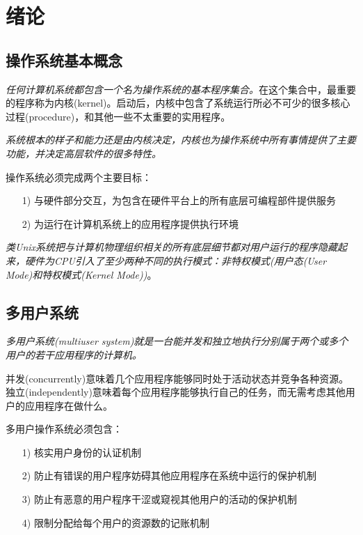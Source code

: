 \chapter{绪论}

\section{操作系统基本概念}

    \emph{任何计算机系统都包含一个名为操作系统的基本程序集合。}在这个集合中，最重要的程序称为内核(kernel)。启动后，内核中包含了系统运行所必不可少的很多核心过程(procedure)，和其他一些不太重要的实用程序。

    \emph{系统根本的样子和能力还是由内核决定，内核也为操作系统中所有事情提供了主要功能，并决定高层软件的很多特性。}

    操作系统必须完成两个主要目标：

\begin{itemize}
    \item [1)] 与硬件部分交互，为包含在硬件平台上的所有底层可编程部件提供服务
    \item [2)] 为运行在计算机系统上的应用程序提供执行环境
\end{itemize}

    \emph{类Unix系统把与计算机物理组织相关的所有底层细节都对用户运行的程序隐藏起来，硬件为CPU引入了至少两种不同的执行模式：非特权模式(用户态(User Mode)和特权模式(Kernel Mode))}。

\section{多用户系统}

    \emph{多用户系统(multiuser system)就是一台能并发和独立地执行分别属于两个或多个用户的若干应用程序的计算机。}

    并发(concurrently)意味着几个应用程序能够同时处于活动状态并竞争各种资源。独立(independently)意味着每个应用程序能够执行自己的任务，而无需考虑其他用户的应用程序在做什么。

    多用户操作系统必须包含：

\begin{itemize}
    \item [1)] 核实用户身份的认证机制
    \item [2)] 防止有错误的用户程序妨碍其他应用程序在系统中运行的保护机制
    \item [3)] 防止有恶意的用户程序干涩或窥视其他用户的活动的保护机制
    \item [4)] 限制分配给每个用户的资源数的记账机制
\end{itemize}

